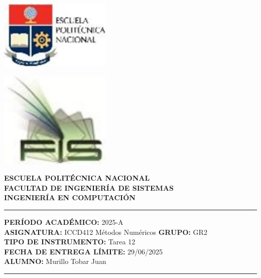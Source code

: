 \documentclass[12pt]{article}
\begin{document}
\begin{minipage}{0.45\textwidth}
    \includegraphics[width=0.4\textwidth]{inFiles/Figures/epnLogo.jpg}
\end{minipage}
\hfill
\begin{minipage}{0.45\textwidth}
    \raggedleft
    \includegraphics[width=0.4\textwidth]{inFiles/Figures/FIS_logo.jpg}
\end{minipage}

\vspace{0.5cm}

\begin{center}
    \textbf{ESCUELA POLITÉCNICA NACIONAL}\\[0.2cm]
    \textbf{FACULTAD DE INGENIERÍA DE SISTEMAS}\\[0.2cm]
    \textbf{INGENIERÍA {\textbf{EN COMPUTACIÓN}}}
\end{center}

\vspace{0.5cm}
\hrule
\vspace{0.5cm}

\noindent\textbf{PERÍODO ACADÉMICO:} 2025-A\\[0.2cm]
\noindent\textbf{ASIGNATURA:} ICCD412 Métodos Numéricos \hfill \textbf{GRUPO:} GR2\\[0.2cm]
\noindent\textbf{TIPO DE INSTRUMENTO:} Tarea 12\\[0.2cm]
\noindent\textbf{FECHA DE ENTREGA LÍMITE:} 29/06/2025\\[0.2cm]
\noindent\textbf{ALUMNO:} Murillo Tobar Juan

\vspace{0.5cm}
\hrule
\vspace{1cm}
\end{document}
